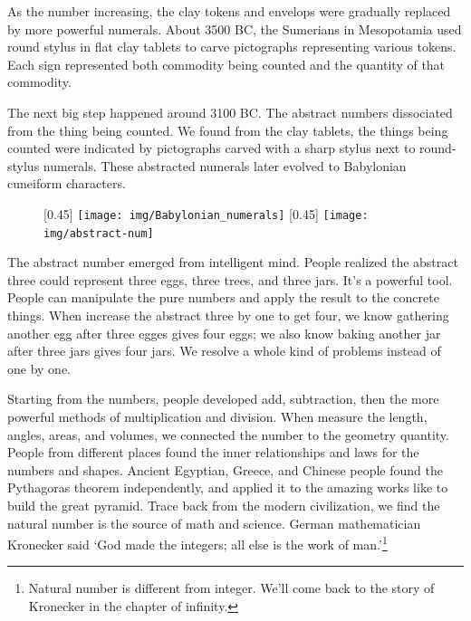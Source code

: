 \documentclass[b5paper]{article}
\begin{document}
As the number increasing, the clay tokens and envelops were gradually replaced by more powerful numerals. About 3500 BC, the Sumerians in Mesopotamia used round stylus in flat clay tablets to carve pictographs representing various tokens. Each sign represented both commodity being counted and the quantity of that commodity.

The next big step happened around 3100 BC. The abstract numbers dissociated from the thing being counted. We found from the clay tablets, the things being counted were indicated by pictographs carved with a sharp stylus next to round-stylus numerals. These abstracted numerals later evolved to Babylonian cuneiform characters.

\begin{figure}[htbp]
 \centering
 [0.45\linewidth]{
   \texttt{[image: img/Babylonian\_numerals]}} \quad \quad
 [0.45\linewidth]{
   \texttt{[image: img/abstract-num]}}
 \captionsetup{labelformat=empty}
 \label{fig:babylonian-num}
 \label{fig:abstract-num}
\end{figure}

The abstract number emerged from intelligent mind. People realized the abstract three could represent three eggs, three trees, and three jars. It's a powerful tool. People can manipulate the pure numbers and apply the result to the concrete things. When increase the abstract three by one to get four, we know gathering another egg after three egges gives four eggs; we also know baking another jar after three jars gives four jars. We resolve a whole kind of problems instead of one by one.

Starting from the numbers, people developed add, subtraction, then the more powerful methods of multiplication and division. When measure the length, angles, areas, and volumes, we connected the number to the geometry quantity. People from different places found the inner relationships and laws for the numbers and shapes. Ancient Egyptian, Greece, and Chinese people found the Pythagoras theorem independently, and applied it to the amazing works like to build the great pyramid. Trace back from the modern civilization, we find the natural number is the source of math and science. German mathematician Kronecker said `God made the integers; all else is the work of man.'\footnote{Natural number is different from integer. We'll come back to the story of Kronecker in the chapter of infinity.}
\end{document}
